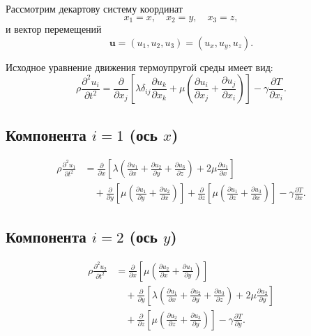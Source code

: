 Рассмотрим декартову систему координат
\[
x_1 = x,\quad x_2 = y,\quad x_3 = z,
\]
и вектор перемещений
\[
\mathbf{u} = (u_1,u_2,u_3) = (u_x,u_y,u_z).
\]

Исходное уравнение движения термоупругой среды имеет вид:
\[
\rho \frac{\partial^2 u_i}{\partial t^2}
=
\frac{\partial}{\partial x_j}
\left[
\lambda \delta_{ij} \frac{\partial u_k}{\partial x_k}
+
\mu
\left(
\frac{\partial u_i}{\partial x_j}
+
\frac{\partial u_j}{\partial x_i}
\right)
\right]
-
\gamma \frac{\partial T}{\partial x_i}.
\]

\subsection*{Компонента $i=1$ (ось $x$)}

\begin{align}
\rho \frac{\partial^2 u_1}{\partial t^2}
&=
\frac{\partial}{\partial x}
\left[
\lambda
\left(
\frac{\partial u_1}{\partial x}
+
\frac{\partial u_2}{\partial y}
+
\frac{\partial u_3}{\partial z}
\right)
+
2\mu \frac{\partial u_1}{\partial x}
\right]
\nonumber\\
&\quad+
\frac{\partial}{\partial y}
\left[
\mu
\left(
\frac{\partial u_1}{\partial y}
+
\frac{\partial u_2}{\partial x}
\right)
\right]
+
\frac{\partial}{\partial z}
\left[
\mu
\left(
\frac{\partial u_1}{\partial z}
+
\frac{\partial u_3}{\partial x}
\right)
\right]
-
\gamma \frac{\partial T}{\partial x}.
\end{align}

\subsection*{Компонента $i=2$ (ось $y$)}

\begin{align}
\rho \frac{\partial^2 u_2}{\partial t^2}
&=
\frac{\partial}{\partial x}
\left[
\mu
\left(
\frac{\partial u_2}{\partial x}
+
\frac{\partial u_1}{\partial y}
\right)
\right]
\nonumber\\
&\quad+
\frac{\partial}{\partial y}
\left[
\lambda
\left(
\frac{\partial u_1}{\partial x}
+
\frac{\partial u_2}{\partial y}
+
\frac{\partial u_3}{\partial z}
\right)
+
2\mu \frac{\partial u_2}{\partial y}
\right]
\nonumber\\
&\quad+
\frac{\partial}{\partial z}
\left[
\mu
\left(
\frac{\partial u_2}{\partial z}
+
\frac{\partial u_3}{\partial y}
\right)
\right]
-
\gamma \frac{\partial T}{\partial y}.
\end{align}

